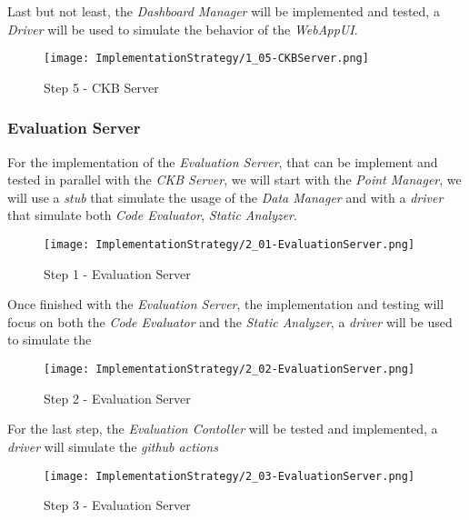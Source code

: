Last but not least, the \textit{Dashboard Manager} will be implemented and tested, a \textit{Driver} will be used to simulate the behavior of the \textit{WebAppUI}.
\begin{figure}[H]
    \label{fig:step5-CKBServer}
    \centering
    \texttt{[image: ImplementationStrategy/1\_05-CKBServer.png]}
    \caption{Step 5 - CKB Server}
\end{figure}
\pagebreak

\subsubsection{Evaluation Server}
For the implementation of the \textit{Evaluation Server}, that can be implement and tested in parallel with the \textit{CKB Server}, we will start with the \textit{Point Manager}, we will use a \textit{stub} that simulate the usage of the \textit{Data Manager} and with a \textit{driver} that simulate both \textit{Code Evaluator}, \textit{Static Analyzer}.
\begin{figure}[H]
    \label{fig:step1-EvaluationServer}
    \centering
    \texttt{[image: ImplementationStrategy/2\_01-EvaluationServer.png]}
    \caption{Step 1 - Evaluation Server}
\end{figure}
\pagebreak
Once finished with the \textit{Evaluation Server}, the implementation and testing will focus on both the \textit{Code Evaluator} and the \textit{Static Analyzer}, a \textit{driver} will be used to simulate the 
\begin{figure}[H]
    \label{fig:step2-EvaluationServer}
    \centering
    \texttt{[image: ImplementationStrategy/2\_02-EvaluationServer.png]}
    \caption{Step 2 - Evaluation Server}
\end{figure}
\pagebreak
For the last step, the \textit{Evaluation Contoller} will be tested and implemented, a \textit{driver} will simulate the \textit{github actions}
\begin{figure}[H]
    \label{fig:step3-EvaluationServer}
    \centering
    \texttt{[image: ImplementationStrategy/2\_03-EvaluationServer.png]}
    \caption{Step 3 - Evaluation Server}
\end{figure}
